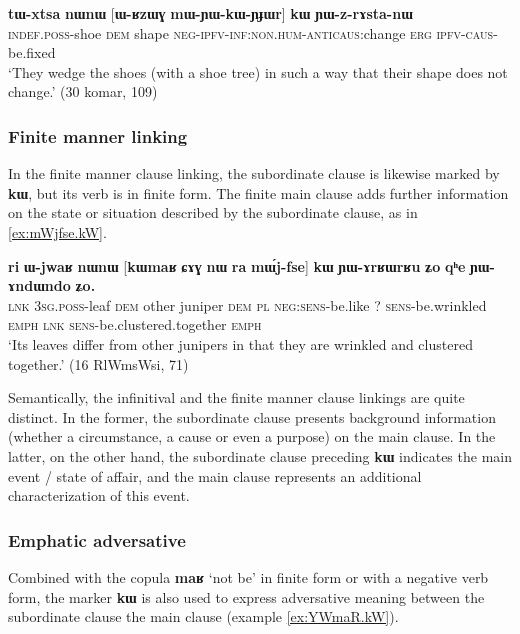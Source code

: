 \documentclass[oldfontcommands,oneside,a4paper,11pt]{article}
\newcommand{\ipa}[1]{{\phon\textbf{#1}}}
\begin{document}
\begin{exe}
\ex \label{ex:mWYWkWYJWr}
\gll
\ipa{tɯ-xtsa}   	\ipa{nɯnɯ}   	[\ipa{ɯ-ʁzɯɣ}   	\ipa{mɯ-ɲɯ-kɯ-ɲɟɯr}]   	\ipa{\textbf{kɯ}}   	\ipa{ɲɯ-z-rɤsta-nɯ}   \\
\textsc{indef.poss}-shoe \textsc{dem} shape \textsc{neg-ipfv-inf:non.hum-anticaus}:change \textsc{erg} \textsc{ipfv-caus}-be.fixed \\
\glt `They wedge the shoes (with a shoe tree)  in such a way that their shape does not change.' (30 komar, 109)
\end{exe}

\subsubsection{Finite manner linking}
In the finite manner clause linking, the subordinate clause is likewise marked by \ipa{kɯ}, but its verb is in finite form. The  finite  main clause adds further information on the state or situation described by the subordinate clause, as in \ref{ex:mWjfse.kW}. 
 

 \begin{exe}
\ex \label{ex:mWjfse.kW}
\gll
\ipa{ri} 	\ipa{ɯ-jwaʁ} 	\ipa{nɯnɯ} 	[\ipa{kɯmaʁ} 	\ipa{ɕɤɣ} 	\ipa{nɯ} \ipa{ra} 	\ipa{mɯ́j-fse}] 	\ipa{\textbf{kɯ}} 	\ipa{ɲɯ-ɤrʁɯrʁu} 	\ipa{ʑo} 	\ipa{qʰe} 	\ipa{ɲɯ-ɤndɯndo} 	\ipa{ʑo.} \\
\textsc{lnk} \textsc{3sg.poss}-leaf \textsc{dem} other juniper \textsc{dem} \textsc{pl} \textsc{neg:sens}-be.like ?{ } \textsc{sens}-be.wrinkled \textsc{emph} \textsc{lnk}  \textsc{sens}-be.clustered.together \textsc{emph} \\
\glt `Its leaves differ from other junipers in that they are wrinkled and clustered together.' (16 RlWmsWsi, 71)
 \end{exe}
 
Semantically,  the infinitival and the finite manner clause linkings are quite distinct. In the former, the subordinate clause presents background information (whether a circumstance, a cause or even a purpose) on the main clause. In the latter, on the other hand, the subordinate clause preceding \ipa{kɯ} indicates the main event / state of affair, and the main clause represents an additional characterization of this event.

 

 \subsubsection{Emphatic adversative} \label{sec:advers}
Combined with the copula \ipa{maʁ} `not be' in finite form or with a negative verb form, the marker \ipa{kɯ} is also used to express adversative meaning between the subordinate clause the main clause (example \ref{ex:YWmaR.kW}).
 
\end{document}
